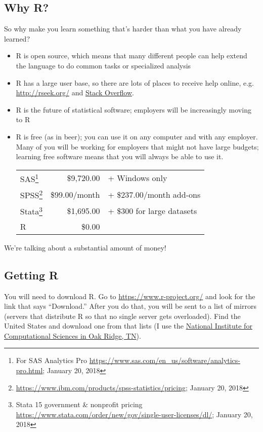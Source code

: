\documentclass[11pt]{lecturenotes}
\begin{document}
\subsection[10]{Why R?}
\slide
So why make you learn something that's harder than what you have already learned? 
\begin{itemize}
\item R is open source, which means that many different people can help extend the language to do common tasks or specialized analysis
\item R has a large user base, so there are lots of places to receive help online, e.g. \url{http://rseek.org/} and \href{https://stackoverflow.com/questions/tagged/r}{Stack Overflow}.
\item R is the future of statistical software; employers will be increasingly moving to R 
\item \slide R is free (as in beer); you can use it on any computer and with any employer. Many of you will be working for employers that might not have large budgets; learning free software means that you will always be able to use it. 

\vspace{1em}

\begin{center}
\begin{tabular}{lrl} \toprule
SAS\footnote{For SAS Analytics Pro \url{https://www.sas.com/en_us/software/analytics-pro.html}; January 20, 2018} & \$9,720.00 & + Windows only \\
SPSS\footnote{\url{https://www.ibm.com/products/spss-statistics/pricing}; January 20, 2018} & \$99.00\slash month & + \$237.00/month add-ons \\
Stata\footnote{Stata 15 government \& nonprofit pricing \url{https://www.stata.com/order/new/gov/single-user-licenses/dl/}; January 20, 2018} & \$1,695.00 & + \$300 for large datasets \\
R & \$0.00 & \\ \bottomrule
\end{tabular}
\end{center}
\end{itemize}

We're talking about a substantial amount of money!

\subsection[5]{Getting R}
You will need to download R. Go to \url{https://www.r-project.org/} and look for the link that says ``Download.'' After you do that, you will be sent to a list of mirrors (servers that distribute R so that no single server gets overloaded). Find the United States and download one from that lists (I use the \href{https://mirrors.nics.utk.edu/cran/}{National Institute for Computational Sciences in Oak Ridge, TN}). 
\end{document}
